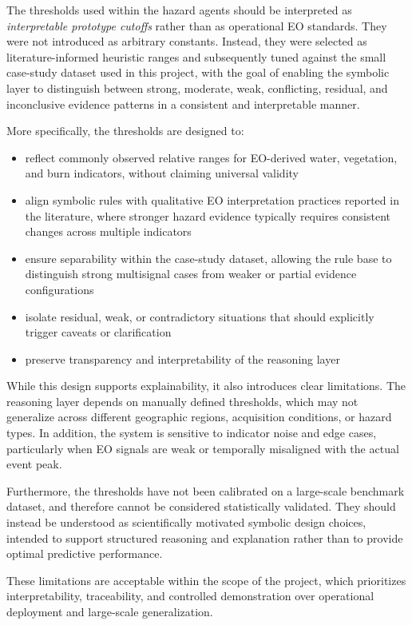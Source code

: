 \documentclass[12pt]{article}
\begin{document}
The thresholds used within the hazard agents should be interpreted as \emph{interpretable prototype cutoffs} rather than as operational EO standards. They were not introduced as arbitrary constants. Instead, they were selected as literature-informed heuristic ranges and subsequently tuned against the small case-study dataset used in this project, with the goal of enabling the symbolic layer to distinguish between strong, moderate, weak, conflicting, residual, and inconclusive evidence patterns in a consistent and interpretable manner.

More specifically, the thresholds are designed to:

\begin{itemize}
\item reflect commonly observed relative ranges for EO-derived water, vegetation, and burn indicators, without claiming universal validity
\item align symbolic rules with qualitative EO interpretation practices reported in the literature, where stronger hazard evidence typically requires consistent changes across multiple indicators
\item ensure separability within the case-study dataset, allowing the rule base to distinguish strong multisignal cases from weaker or partial evidence configurations
\item isolate residual, weak, or contradictory situations that should explicitly trigger caveats or clarification
\item preserve transparency and interpretability of the reasoning layer
\end{itemize}

While this design supports explainability, it also introduces clear limitations. The reasoning layer depends on manually defined thresholds, which may not generalize across different geographic regions, acquisition conditions, or hazard types. In addition, the system is sensitive to indicator noise and edge cases, particularly when EO signals are weak or temporally misaligned with the actual event peak.

Furthermore, the thresholds have not been calibrated on a large-scale benchmark dataset, and therefore cannot be considered statistically validated. They should instead be understood as scientifically motivated symbolic design choices, intended to support structured reasoning and explanation rather than to provide optimal predictive performance.

These limitations are acceptable within the scope of the project, which prioritizes interpretability, traceability, and controlled demonstration over operational deployment and large-scale generalization.
\end{document}
